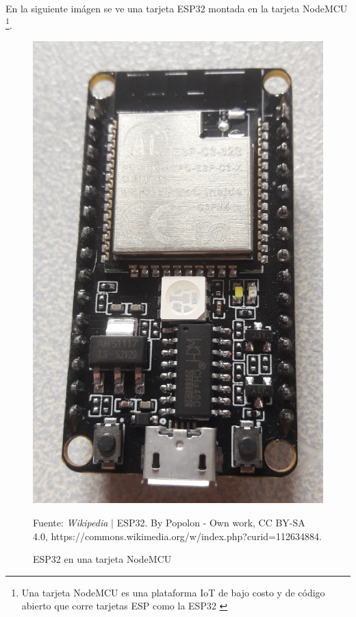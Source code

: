 \documentclass[conference]{IEEEtran}
\begin{document}
    \bigbreak

    En la siguiente imágen se ve una tarjeta ESP32 montada en la tarjeta NodeMCU \footnote{Una tarjeta NodeMCU es una plataforma IoT de bajo costo y de código abierto que corre tarjetas ESP como la ESP32 \cite{wikipedia-mcu-2022B}}.

    \begin{figure}[H]
        \centering
        \includegraphics[width=0.3\paperwidth]{images/esp32-board}
        \caption{ESP32 en una tarjeta NodeMCU} \footnotesize
        Fuente: \textit{Wikipedia} $\mid$ ESP32. By Popolon - Own work, CC BY-SA 4.0, https://commons.wikimedia.org/w/index.php?curid=112634884.
    \end{figure}
\end{document}
